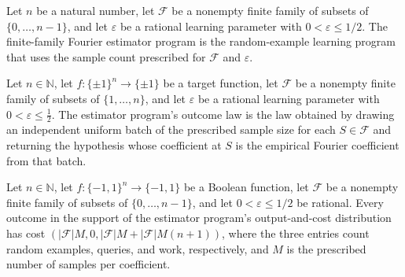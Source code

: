 \begin{definition}
\label{FABL.finiteFamilyFourierEstimatorProgram}
\leanok
{}
Let $n$ be a natural number, let $\mathcal F$ be a nonempty finite family of subsets of
$\{0,\ldots,n-1\}$, and let $\varepsilon$ be a rational learning parameter with
$0<\varepsilon\le 1/2$. The finite-family Fourier estimator program is the
random-example learning program that uses the sample count prescribed for $\mathcal F$
and $\varepsilon$.
\end{definition}

\begin{theorem}
\label{FABL.runWithCost_finiteFamilyFourierEstimatorProgram}
\leanok
{}
Let $n\in\mathbb N$, let $f:\{\pm1\}^n\to\{\pm1\}$ be a target function, let $\mathcal
F$ be a nonempty finite family of subsets of $\{1,\ldots,n\}$, and let $\varepsilon$ be
a rational learning parameter with $0<\varepsilon\le\tfrac12$. The estimator program's
outcome law is the law obtained by drawing an independent uniform batch of the
prescribed sample size for each $S\in\mathcal F$ and returning the hypothesis whose
coefficient at $S$ is the empirical Fourier coefficient from that batch.
\end{theorem}

\begin{theorem}
\label{FABL.finiteFamilyFourierEstimatorProgram_cost_eq}
\leanok
{}
Let $n\in\mathbb{N}$, let $f:\{-1,1\}^n\to\{-1,1\}$ be a Boolean function, let
$\mathcal{F}$ be a nonempty finite family of subsets of $\{0,\ldots,n-1\}$, and let
$0<\varepsilon\le 1/2$ be rational. Every outcome in the support of the estimator
program's output-and-cost distribution has cost
$(|\mathcal{F}|M,0,|\mathcal{F}|M+|\mathcal{F}|M(n+1))$, where the three entries count
random examples, queries, and work, respectively, and $M$ is the prescribed number of
samples per coefficient.
\end{theorem}

